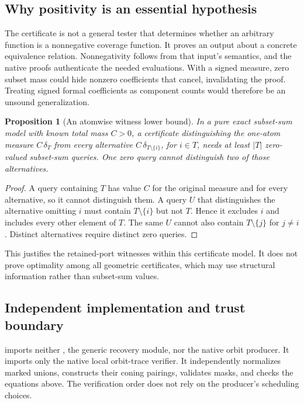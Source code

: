 \documentclass[11pt,letterpaper]{article}
\newtheorem{proposition}[theorem]{Proposition}
\theoremstyle{definition}\newtheorem{definition}[theorem]{Definition}
\theoremstyle{remark}\newtheorem{remark}[theorem]{Remark}
\begin{document}
\subsection{Why positivity is an essential hypothesis}

The certificate is not a general tester that determines whether an arbitrary function is a nonnegative coverage function. It proves an output about a concrete equivalence relation. Nonnegativity follows from that input's semantics, and the native proofs authenticate the needed evaluations. With a signed measure, zero subset mass could hide nonzero coefficients that cancel, invalidating the proof. Treating signed formal coefficients as component counts would therefore be an unsound generalization.

\begin{proposition}[An atomwise witness lower bound]
\label{prop:certlower}
In a pure exact subset-sum model with known total mass $C>0$, a certificate distinguishing the one-atom measure $C\,\delta_T$ from every alternative $C\,\delta_{T\setminus\{i\}}$, for $i\in T$, needs at least $|T|$ zero-valued subset-sum queries. One zero query cannot distinguish two of those alternatives.
\end{proposition}
\begin{proof}
A query containing $T$ has value $C$ for the original measure and for every alternative, so it cannot distinguish them. A query $U$ that distinguishes the alternative omitting $i$ must contain $T\setminus\{i\}$ but not $T$. Hence it excludes $i$ and includes every other element of $T$. The same $U$ cannot also contain $T\setminus\{j\}$ for $j\ne i$. Distinct alternatives require distinct zero queries.
\end{proof}

This justifies the retained-port witnesses within this certificate model. It does not prove optimality among all geometric certificates, which may use structural information rather than subset-sum values.

\subsection{Independent implementation and trust boundary}

 imports neither , the generic recovery module, nor the native orbit producer. It imports only the native local orbit-trace verifier. It independently normalizes marked unions, constructs their coning pairings, validates masks, and checks the equations above. The verification order does not rely on the producer's scheduling choices.
\end{document}
